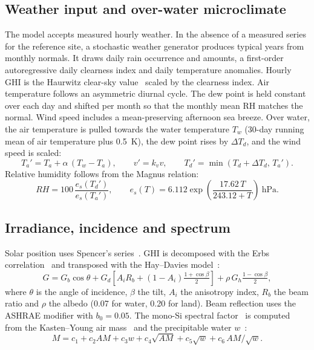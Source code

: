 \documentclass[preprint,11pt]{elsarticle}
\begin{document}
\subsection{Weather input and over-water microclimate}\label{sec:weather}
The model accepts measured hourly weather. In the absence of a measured series for the reference site, a stochastic
weather generator produces typical years from monthly normals. It draws daily rain occurrence and amounts, a
first-order autoregressive daily clearness index and daily temperature anomalies. Hourly GHI is the Haurwitz clear-sky
value~\cite{haurwitz1945} scaled by the clearness index. Air temperature follows an asymmetric diurnal cycle. The dew
point is held constant over each day and shifted per month so that the monthly mean RH matches the normal. Wind speed
includes a mean-preserving afternoon sea breeze. Over water, the air temperature is pulled towards the water
temperature $T_w$ (30-day running mean of air temperature plus \SI{0.5}{\kelvin}), the dew point rises by $\Delta T_d$,
and the wind speed is scaled:
\begin{equation}
T_a' = T_a + \alpha\,(T_w - T_a),\qquad v' = k_v v,\qquad T_d' = \min(T_d + \Delta T_d,\,T_a').
\label{eq:micro}
\end{equation}
Relative humidity follows from the Magnus relation:
\begin{equation}
\mathit{RH}=100\,\frac{e_s(T_d')}{e_s(T_a')},\qquad e_s(T)=6.112\exp\!\left(\frac{17.62\,T}{243.12+T}\right)~\text{hPa}.
\label{eq:magnus}
\end{equation}

\subsection{Irradiance, incidence and spectrum}
Solar position uses Spencer's series~\cite{spencer1971}. GHI is decomposed with the Erbs correlation~\cite{erbs1982}
and transposed with the Hay--Davies model~\cite{hay1980}:
\begin{equation}
G = G_b\cos\theta + G_d\left[A_i R_b + (1-A_i)\tfrac{1+\cos\beta}{2}\right] + \rho\,G_h\tfrac{1-\cos\beta}{2},
\label{eq:poa}
\end{equation}
where $\theta$ is the angle of incidence, $\beta$ the tilt, $A_i$ the anisotropy index, $R_b$ the beam ratio and $\rho$
the albedo (0.07 for water, 0.20 for land). Beam reflection uses the ASHRAE modifier with $b_0=0.05$. The mono-Si
spectral factor~\cite{lee2016} is computed from the Kasten--Young air mass~\cite{kasten1989} and the precipitable water
$w$~\cite{gueymard1994}:
\begin{equation}
M = c_1 + c_2\mathit{AM} + c_3 w + c_4\sqrt{\mathit{AM}} + c_5\sqrt{w} + c_6\,\mathit{AM}/\sqrt{w}.
\label{eq:spectral}
\end{equation}
\end{document}
